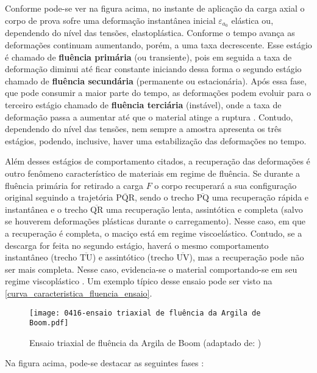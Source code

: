 Conforme pode-se ver na figura acima, no instante de aplicação da carga axial o corpo de prova sofre uma deformação instantânea inicial $\varepsilon_{a_{0}}$ elástica ou, dependendo do nível das tensões, elastoplástica. Conforme o tempo avança as deformações continuam aumentando, porém, a uma taxa decrescente. Esse estágio é chamado de \textbf{fluência primária} (ou transiente), pois em seguida a taxa de deformação diminui até ficar constante iniciando dessa forma o segundo estágio chamado de \textbf{fluência secundária} (permanente ou estacionária). Após essa fase, que pode consumir a maior parte do tempo, as deformações podem evoluir para o terceiro estágio chamado de \textbf{fluência terciária} (instável), onde a taxa de deformação passa a aumentar até que o material atinge a ruptura \cite{Costa1984}. Contudo, dependendo do nível das tensões, nem sempre a amostra apresenta os três estágios, podendo, inclusive, haver uma estabilização das deformações no tempo.

Além desses estágios de comportamento citados, a recuperação das deformações é outro fenômeno característico de materiais em regime de fluência. Se durante a fluência primária for retirado a carga $F$ o corpo recuperará a sua configuração original seguindo a trajetória $\overline{\textrm{PQR}}$, sendo o trecho $\overline{\textrm{PQ}}$ uma recuperação rápida e instantânea e o trecho $\overline{\textrm{QR}}$ uma recuperação lenta, assintótica e completa (salvo se houverem deformações plásticas durante o carregamento). Nesse caso, em que a recuperação é completa, o maciço está em regime viscoelástico. Contudo, se a descarga for feita no segundo estágio, haverá o mesmo comportamento instantâneo (trecho $\overline{\textrm{TU}}$) e assintótico (trecho $\overline{\textrm{UV}}$), mas a recuperação pode não ser mais completa. Nesse caso, evidencia-se o material comportando-se em seu regime viscoplástico \cite{Costa1984}. Um exemplo típico desse ensaio pode ser visto na \autoref{curva_caracteristica_fluencia_ensaio}.

\begin{figure}[H]
	\begin{center}
		\texttt{[image: 0416-ensaio triaxial de fluência da Argila de Boom.pdf]}
	\end{center}
	\caption{\label{curva_caracteristica_fluencia_ensaio}Ensaio triaxial de fluência da Argila de Boom (adaptado de: )}
\end{figure}

Na figura acima, pode-se destacar as seguintes fases \cite[p. 42]{Rousset1988}:

